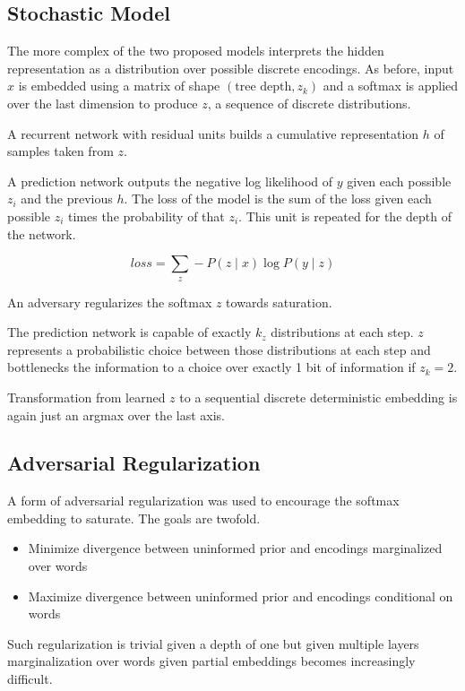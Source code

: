 \documentclass[sigconf]{acmart}
\begin{document}
\subsection{Stochastic Model}

The more complex of the two proposed models interprets the hidden representation as a distribution over possible discrete encodings. As before, input $x$ is embedded using a matrix of shape $(\text{tree depth}, z_k)$ and a softmax is applied over the last dimension to produce $z$, a sequence of discrete distributions.

A recurrent network with residual units builds a cumulative representation $h$ of samples taken from $z$.

A prediction network outputs the negative log likelihood of $y$ given each possible $z_i$ and the previous $h$. The loss of the model is the sum of the loss given each possible $z_i$ times the probability of that $z_i$. This unit is repeated for the depth of the network.

$$ loss = \sum_z-P(z \mid x) \log P(y \mid z)$$

An adversary regularizes the softmax $z$ towards saturation.

The prediction network is capable of exactly $k_z$ distributions at each step. $z$ represents a probabilistic choice between those distributions at each step and bottlenecks the information to a choice over exactly 1 bit of information if $z_k=2$.

Transformation from learned $z$ to a sequential discrete deterministic embedding is again just an argmax over the last axis.

\subsection{Adversarial Regularization}

A form of adversarial regularization was used to encourage the softmax embedding to saturate. The goals are twofold.

\begin{itemize}
\item Minimize divergence between uninformed prior and encodings marginalized over words
\item Maximize divergence between uninformed prior and encodings conditional on words
\end{itemize}

Such regularization is trivial given a depth of one but given multiple layers marginalization over words given partial embeddings becomes increasingly difficult. 
\end{document}

